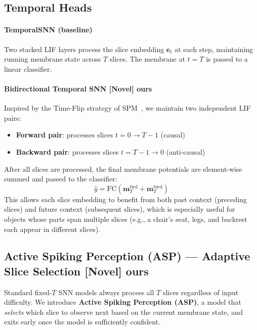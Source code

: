 \documentclass[11pt,a4paper]{article}
\newcommand{\novel}[1]{\textcolor{novelgreen}{\textbf{[Novel]} #1}}
\begin{document}
\subsection{Temporal Heads}

\paragraph{TemporalSNN (baseline)}
Two stacked LIF layers process the slice embedding $\mathbf{e}_t$ at each step,
maintaining running membrane state across $T$ slices. The membrane at $t=T$ is
passed to a linear classifier.

\paragraph{Bidirectional Temporal SNN \novel{ours}}
Inspired by the Time-Flip strategy of SPM~\cite{spm2025}, we maintain two
independent LIF pairs:
\begin{itemize}[leftmargin=1.2cm]
  \item \textbf{Forward pair}: processes slices $t = 0 \to T-1$ (causal)
  \item \textbf{Backward pair}: processes slices $t = T-1 \to 0$ (anti-causal)
\end{itemize}
After all slices are processed, the final membrane potentials are element-wise
summed and passed to the classifier:
\begin{equation}
  \hat{y} = \text{FC}\!\left(\mathbf{m}^\text{fwd}_{T} + \mathbf{m}^\text{bwd}_{T}\right)
\end{equation}
This allows each slice embedding to benefit from both past context (preceding
slices) and future context (subsequent slices), which is especially useful for
objects whose parts span multiple slices (e.g., a chair's seat, legs, and
backrest each appear in different slices).

\subsection{Active Spiking Perception (ASP) --- Adaptive Slice Selection \novel{ours}}
\label{sec:asp_arch}

Standard fixed-$T$ SNN models always process all $T$ slices regardless of input
difficulty. We introduce \textbf{Active Spiking Perception (ASP)}, a model that
\emph{selects} which slice to observe next based on the current membrane state,
and exits early once the model is sufficiently confident.
\end{document}
